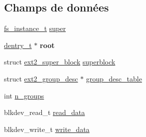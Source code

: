 \subsection*{\-Champs de données}
\begin{DoxyCompactItemize}
\item 
\hyperlink{vfs_8h_a0eefa9aac35a5462ebf1e038992ca860}{fs\-\_\-instance\-\_\-t} \hyperlink{struct__ext2__fs__instance__t_a456ee695fb1a0b71edadda9f4504ca2d}{super}
\item 
\hypertarget{struct__ext2__fs__instance__t_a52f883f2d709ab3b4dff94b5b7100973}{\hyperlink{vfs_8h_ade5c998c6b3f09d2cf45d0e5ef8787da}{dentry\-\_\-t} $\ast$ {\bfseries root}}\label{struct__ext2__fs__instance__t_a52f883f2d709ab3b4dff94b5b7100973}

\item 
struct \hyperlink{structext2__super__block}{ext2\-\_\-super\-\_\-block} \hyperlink{struct__ext2__fs__instance__t_a81ad8719743e20da6f661c2586b56ad2}{superblock}
\item 
struct \hyperlink{structext2__group__desc}{ext2\-\_\-group\-\_\-desc} $\ast$ \hyperlink{struct__ext2__fs__instance__t_acc01ef58cbc6cfa9d3ff4e08709a561a}{group\-\_\-desc\-\_\-table}
\item 
int \hyperlink{struct__ext2__fs__instance__t_a81a5e5b8f7d46d744c96a4f28317e59f}{n\-\_\-groups}
\item 
blkdev\-\_\-read\-\_\-t \hyperlink{struct__ext2__fs__instance__t_ac3ea85962b66914cb42ec884d70a853d}{read\-\_\-data}
\item 
blkdev\-\_\-write\-\_\-t \hyperlink{struct__ext2__fs__instance__t_a90d334c34e9aeea01be13fe1ed66ba7b}{write\-\_\-data}
\end{DoxyCompactItemize}


